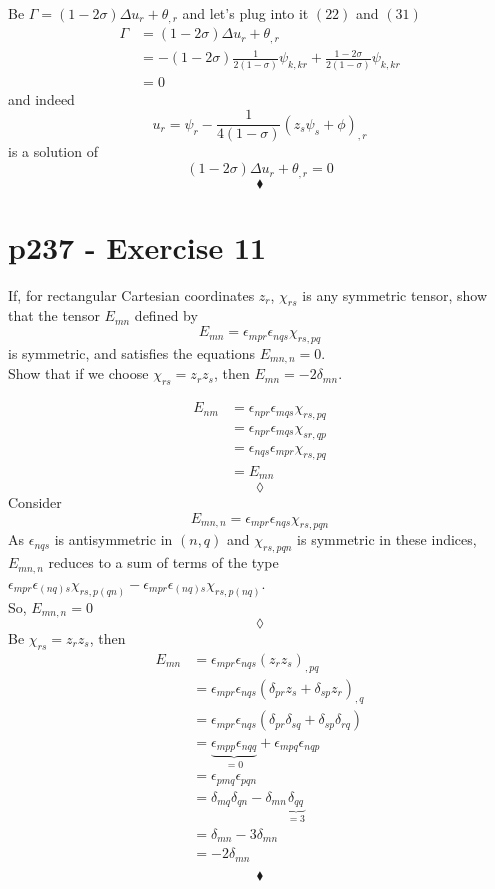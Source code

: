 Be $\Gamma= \left(1-2\sigma\right)\Delta u_r+\theta_{,r}$ and let's plug into it $(22)$ and $(31)$
\begin{align}
\Gamma&= \left(1-2\sigma\right)\Delta u_r+\theta_{,r}\\
&= -\left(1-2\sigma\right)\frac{1}{2\left(1-\sigma\right)} \psi_{k,kr}+\frac{1-2\sigma}{2\left(1-\sigma\right)}\psi_{k,kr}\\
&=0
\end{align}
and indeed $$u_r=\psi_r-\frac{1}{4\left(1-\sigma\right)}\left(z_s\psi_s+\phi\right)_{,r}$$ is a solution of $$\left(1-2\sigma\right)\Delta u_r+\theta_{,r}=0$$
$$\blacklozenge$$
\newpage


\section{p237 - Exercise 11}
\begin{tcolorbox}
If, for rectangular Cartesian coordinates $z_r$, $\chi_{rs}$ is any symmetric tensor, show that the tensor $E_{mn}$ defined by
$$E_{mn}= \epsilon_{mpr}\epsilon_{nqs}\chi_{rs,pq}$$
is symmetric, and satisfies the equations $E_{mn,n}= 0$.\\ Show that if we choose $\chi_{rs}= z_rz_s$, then $E_{mn}= -2\delta_{mn}$.
\end{tcolorbox}
\begin{align}
E_{nm}&= \epsilon_{npr}\epsilon_{mqs}\chi_{rs,pq}\\
&= \epsilon_{npr}\epsilon_{mqs}\chi_{sr,qp}\\
&= \epsilon_{nqs}\epsilon_{mpr}\chi_{rs,pq}\\
&= E_{mn}
\end{align}
$$\lozenge$$
Consider $$E_{mn,n}= \epsilon_{mpr}\epsilon_{nqs}\chi_{rs,pqn}$$
As $\epsilon_{nqs}$ is antisymmetric in $(n,q)$ and $\chi_{rs,pqn}$ is symmetric in these indices,  $E_{mn,n}$ reduces to a sum of terms of the type $\epsilon_{mpr}\epsilon_{(nq)s}\chi_{rs,p(qn)}-\epsilon_{mpr}\epsilon_{(nq)s}\chi_{rs,p(nq)}$.\\
So, $E_{mn,n}=0$
$$\lozenge$$
Be $\chi_{rs}= z_rz_s$, then
\begin{align}
E_{mn}&= \epsilon_{mpr}\epsilon_{nqs}(z_rz_s)_{,pq}\\
&= \epsilon_{mpr}\epsilon_{nqs}(\delta_{pr}z_s+\delta_{sp}z_r)_{,q}\\
&= \epsilon_{mpr}\epsilon_{nqs}(\delta_{pr}\delta_{sq}+\delta_{sp}\delta_{rq})\\
&= \underbrace{\epsilon_{mpp}\epsilon_{nqq}}_{=0}+\epsilon_{mpq}\epsilon_{nqp}\\
&= \epsilon_{pmq}\epsilon_{pqn}\\
&= \delta_{mq}\delta_{qn}-\delta_{mn}\underbrace{\delta_{qq}}_{=3}\\
&= \delta_{mn}-3\delta_{mn}\\
&= -2\delta_{mn}\\
\end{align}
$$\blacklozenge$$
\newpage


